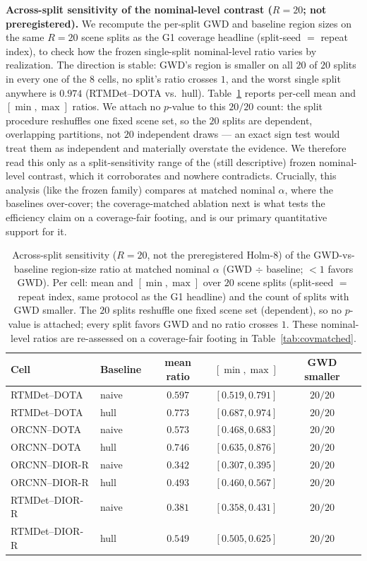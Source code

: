 \documentclass[journal]{IEEEtran}
\begin{document}
\textbf{Across-split sensitivity of the nominal-level contrast ($R{=}20$; not preregistered).} We recompute
the per-split GWD and baseline region sizes on the same $R{=}20$ scene splits as the G1 coverage headline
(split-seed $=$ repeat index), to check how the frozen single-split nominal-level ratio varies by
realization. The direction is stable: GWD's region is smaller on all $20$ of $20$ splits in every one
of the $8$ cells, no split's ratio crosses $1$, and the worst single split anywhere is $0.974$
(RTMDet--DOTA vs.\ hull). Table~\ref{tab:r20holm} reports per-cell mean and $[\min,\max]$ ratios.
We attach no $p$-value to this $20/20$ count: the split procedure reshuffles one fixed scene
set, so the $20$ splits are dependent, overlapping partitions, not $20$ independent draws --- an exact sign
test would treat them as independent and materially overstate the evidence. We therefore read this only as a
split-sensitivity range of the (still descriptive) frozen nominal-level contrast, which it corroborates and
nowhere contradicts. Crucially, this analysis (like the frozen family) compares at matched nominal
$\alpha$, where the baselines over-cover; the coverage-matched ablation next is what tests the efficiency
claim on a coverage-fair footing, and is our primary quantitative support for it.

\begin{table}[!t]\centering\small
\caption{Across-split sensitivity ($R{=}20$, not the preregistered Holm-8) of the
GWD-vs-baseline region-size ratio at matched nominal $\alpha$ (GWD $\div$ baseline; ${<}1$ favors
GWD). Per cell: mean and $[\min,\max]$ over $20$ scene splits (split-seed $=$ repeat index, same protocol as
the G1 headline) and the count of splits with GWD smaller. The $20$ splits reshuffle one fixed scene set
(dependent), so no $p$-value is attached; every split favors GWD and no ratio crosses $1$. These
nominal-level ratios are re-assessed on a coverage-fair footing in Table~\ref{tab:covmatched}.}
\label{tab:r20holm}
\begin{tabular}{llccc}
\toprule
Cell & Baseline & mean ratio & $[\min,\max]$ & GWD smaller \\
\midrule
RTMDet--DOTA   & naive & $0.597$ & $[0.519,0.791]$ & $20/20$ \\
RTMDet--DOTA   & hull  & $0.773$ & $[0.687,0.974]$ & $20/20$ \\
ORCNN--DOTA    & naive & $0.573$ & $[0.468,0.683]$ & $20/20$ \\
ORCNN--DOTA    & hull  & $0.746$ & $[0.635,0.876]$ & $20/20$ \\
ORCNN--DIOR-R  & naive & $0.342$ & $[0.307,0.395]$ & $20/20$ \\
ORCNN--DIOR-R  & hull  & $0.493$ & $[0.460,0.567]$ & $20/20$ \\
RTMDet--DIOR-R & naive & $0.381$ & $[0.358,0.431]$ & $20/20$ \\
RTMDet--DIOR-R & hull  & $0.549$ & $[0.505,0.625]$ & $20/20$ \\
\bottomrule
\end{tabular}
\end{table}
\end{document}
